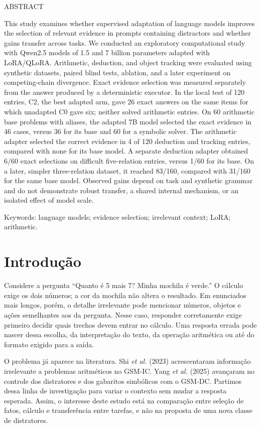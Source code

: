 \documentclass[12pt,a4paper]{article}
\begin{document}
\begin{singlespace}
\noindent ABSTRACT\par
\noindent This study examines whether supervised adaptation of language models improves the selection of relevant evidence in prompts containing distractors and whether gains transfer across tasks. We conducted an exploratory computational study with Qwen2.5 models of 1.5 and 7 billion parameters adapted with LoRA/QLoRA. Arithmetic, deduction, and object tracking were evaluated using synthetic datasets, paired blind tests, ablation, and a later experiment on competing-chain divergence. Exact evidence selection was measured separately from the answer produced by a deterministic executor. In the local test of 120 entries, C2, the best adapted arm, gave 26 exact answers on the same items for which unadapted C0 gave six; neither solved arithmetic entries. On 60 arithmetic base problems with aliases, the adapted 7B model selected the exact evidence in 46 cases, versus 36 for its base and 60 for a symbolic solver. The arithmetic adapter selected the correct evidence in 4 of 120 deduction and tracking entries, compared with none for its base model. A separate deduction adapter obtained 6/60 exact selections on difficult five-relation entries, versus 1/60 for its base. On a later, simpler three-relation dataset, it reached 83/160, compared with 31/160 for the same base model. Observed gains depend on task and synthetic grammar and do not demonstrate robust transfer, a shared internal mechanism, or an isolated effect of model scale.

\noindent Keywords: language models; evidence selection; irrelevant context; LoRA; arithmetic.
\end{singlespace}

\section{Introdução}
Considere a pergunta ``Quanto é 5 mais 7? Minha mochila é verde.'' O cálculo exige os dois números; a cor da mochila não altera o resultado. Em enunciados mais longos, porém, o detalhe irrelevante pode mencionar números, objetos e ações semelhantes aos da pergunta. Nesse caso, responder corretamente exige primeiro decidir quais trechos devem entrar no cálculo. Uma resposta errada pode nascer dessa escolha, da interpretação do texto, da operação aritmética ou até do formato exigido para a saída.

O problema já aparece na literatura. Shi \textit{et al.} (2023) acrescentaram informação irrelevante a problemas aritméticos no GSM-IC. Yang \textit{et al.} (2025) avançaram no controle dos distratores e dos gabaritos simbólicos com o GSM-DC. Partimos dessa linha de investigação para variar o contexto sem mudar a resposta esperada. Assim, o interesse deste estudo está na comparação entre seleção de fatos, cálculo e transferência entre tarefas, e não na proposta de uma nova classe de distratores.
\end{document}
